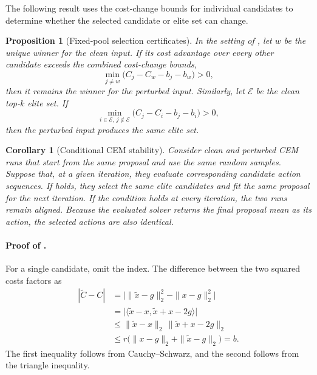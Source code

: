 \documentclass[10pt]{article}
\newtheorem{proposition}{Proposition}
\newtheorem{corollary}{Corollary}
\begin{document}
The following result uses the cost-change bounds for individual candidates to
determine whether the selected candidate or elite set can change.

\begin{proposition}[Fixed-pool selection certificates]\label{prop:fixed-pool-certificates}
In the setting of , let $w$ be the unique
winner for the clean input. If its cost advantage over every other candidate
exceeds the combined cost-change bounds,
\begin{equation}
\min_{j\ne w}\bigl(C_j-C_w-b_j-b_w\bigr)>0,
\label{eq:top1-certificate-main}
\end{equation}
then it remains the winner for the perturbed input. Similarly, let $\mathcal
E$ be the clean top-$k$ elite set. If
\begin{equation}
\min_{i\in\mathcal E,\,j\notin\mathcal E}
\bigl(C_j-C_i-b_j-b_i\bigr)>0,
\label{eq:elite-certificate-main}
\end{equation}
then the perturbed input produces the same elite set.
\end{proposition}

\begin{corollary}[Conditional CEM stability]\label{cor:adaptive-cem-alignment}
Consider clean and perturbed CEM runs that start from the same proposal and use
the same random samples. Suppose that, at a given iteration, they evaluate
corresponding candidate action sequences. If
 holds, they select the same elite candidates
and fit the same proposal for the next iteration. If the condition holds at
every iteration, the two runs remain aligned. Because the evaluated solver
returns the final proposal mean as its action, the selected actions are also
identical.
\end{corollary}

\paragraph{Proof of .}
For a single candidate, omit the index. The difference between the two squared
costs factors as
\begin{align}
|\tilde C-C|
&=\bigl|\|\tilde x-g\|_2^2-\|x-g\|_2^2\bigr| \\
&=\bigl|\langle \tilde x-x,\tilde x+x-2g\rangle\bigr| \\
&\le \|\tilde x-x\|_2\,\|\tilde x+x-2g\|_2 \\
&\le r\bigl(\|x-g\|_2+\|\tilde x-g\|_2\bigr)=b .
\end{align}
The first inequality follows from Cauchy--Schwarz, and the second follows from
the triangle inequality.
\end{document}

